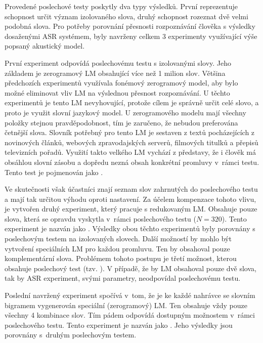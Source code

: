 Provedené poslechové testy poskytly dva typy výsledků.
První reprezentuje schopnost určit význam izolovaného slova, druhý schopnost rozeznat dvě velmi podobná slova.
Pro potřeby porovnání přesnosti rozpoznávání člověka s výsledky dosaženými ASR systémem, byly navrženy celkem $3$ experimenty využívající výše popsaný akustický model.

První experiment odpovídá poslechovému testu s izolovanými slovy.
Jeho základem je zerogramový LM obsahující více než 1 milion slov.
Většina předchozích experimentů využívala fonémový zerogramový model, aby bylo možné eliminovat vliv LM na výslednou přesnost rozpoznávání.
U těchto experimentů je tento LM nevyhovující, protože cílem je správně určit celé slovo, a proto je využit slovní jazykový model.
U zerogramového modelu mají všechny položky stejnou pravděpodobnost, tím je zaručeno, že nebudou preferována četnější slova.
Slovník potřebný pro tento LM je sestaven z textů pocházejících z novinových článků, webových zpravodajských serverů, filmových titulků a přepisů televizních pořadů.
Využití takto velkého LM vychází z představy, že i člověk má obsáhlou slovní zásobu a dopředu nezná obsah konkrétní promluvy v~rámci testu.
Tento test je pojmenován jako .

Ve skutečnosti však účastníci znají seznam slov zahrnutých do poslechového testu a mají tak určitou výhodu oproti  nastavení.
Za účelem kompenzace tohoto vlivu, je vytvořen druhý experiment, který pracuje s redukovaným LM.
Obsahuje pouze slova, která se opravdu vyskytla v~rámci poslechového testu ($N = 320$).
Tento experiment je nazván jako .
Výsledky obou těchto experimentů byly porovnány s poslechovým testem na izolovaných slovech.
Další možností by mohlo být vytvoření speciálních LM pro každou promluvu.
Ten by obsahoval pouze komplementární slova.
Problémem tohoto postupu je třetí možnost, kterou obsahuje poslechový test (tzv. ).
V případě, že by LM obsahoval pouze dvě slova, tak by ASR experiment, svými parametry, neodpovídal poslechovému testu.

Poslední navržený experiment spočívá v~tom, že je ke každé nahrávce se slovním bigramem vygenerován speciální (zerogramový) LM.
Ten obsahuje vždy pouze všechny 4 kombinace slov.
Tím pádem odpovídá dostupným možnostem v~rámci poslechového testu.
Tento experiment je nazván jako .
Jeho výsledky jsou porovnány s~druhým poslechovým testem.

